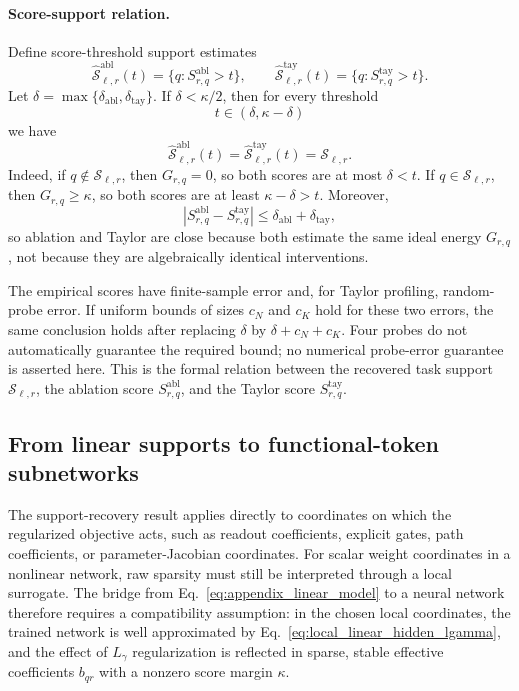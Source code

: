 \documentclass{article}
\begin{document}
\paragraph{Score-support relation.}
Define score-threshold support estimates
\begin{equation}
\widehat{\mathcal S}^{\mathrm{abl}}_{\ell,r}(t)=
\{q:S^{\mathrm{abl}}_{r,q}>t\},
\qquad
\widehat{\mathcal S}^{\mathrm{tay}}_{\ell,r}(t)=
\{q:S^{\mathrm{tay}}_{r,q}>t\}.
\end{equation}
Let \(\delta=\max\{\delta_{\mathrm{abl}},\delta_{\mathrm{tay}}\}\). If \(\delta<\kappa/2\), then for every threshold
\begin{equation}
t\in(\delta,\kappa-\delta)
\end{equation}
we have
\begin{equation}
\widehat{\mathcal S}^{\mathrm{abl}}_{\ell,r}(t)
=
\widehat{\mathcal S}^{\mathrm{tay}}_{\ell,r}(t)
=
\mathcal S_{\ell,r}.
\label{eq:score_support_equivalence_lgamma}
\end{equation}
Indeed, if \(q\notin\mathcal S_{\ell,r}\), then \(G_{r,q}=0\), so both scores are at most \(\delta<t\). If \(q\in\mathcal S_{\ell,r}\), then \(G_{r,q}\ge\kappa\), so both scores are at least \(\kappa-\delta>t\). Moreover,
\begin{equation}
\left|S^{\mathrm{abl}}_{r,q}-S^{\mathrm{tay}}_{r,q}\right|
\le
\delta_{\mathrm{abl}}+\delta_{\mathrm{tay}},
\end{equation}
so ablation and Taylor are close because both estimate the same ideal energy \(G_{r,q}\), not because they are algebraically identical interventions.

The empirical scores have finite-sample error and, for Taylor profiling, random-probe error. If uniform bounds of sizes $c_N$ and $c_K$ hold for these two errors, the same conclusion holds after replacing $\delta$ by $\delta+c_N+c_K$. Four probes do not automatically guarantee the required bound; no numerical probe-error guarantee is asserted here. This is the formal relation between the recovered task support \(\mathcal S_{\ell,r}\), the ablation score \(S^{\mathrm{abl}}_{r,q}\), and the Taylor score \(S^{\mathrm{tay}}_{r,q}\).

\subsection{From linear supports to functional-token subnetworks}

The support-recovery result applies directly to coordinates on which the regularized objective acts, such as readout coefficients, explicit gates, path coefficients, or parameter-Jacobian coordinates. For scalar weight coordinates in a nonlinear network, raw sparsity must still be interpreted through a local surrogate. The bridge from Eq.~\eqref{eq:appendix_linear_model} to a neural network therefore requires a compatibility assumption: in the chosen local coordinates, the trained network is well approximated by Eq.~\eqref{eq:local_linear_hidden_lgamma}, and the effect of \(L_\gamma\) regularization is reflected in sparse, stable effective coefficients \(b_{qr}\) with a nonzero score margin \(\kappa\).
\end{document}
